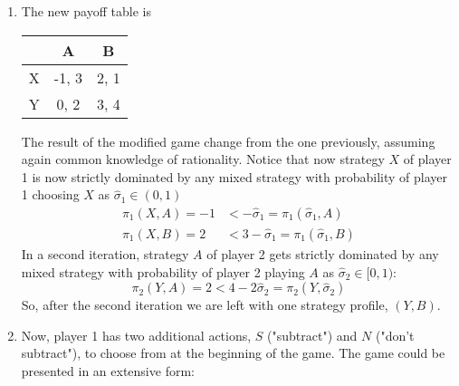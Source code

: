 \documentclass[]{article}
\begin{document}
\begin{enumerate}[label=(\roman*)]
	\item The new payoff table is
	\begin{table}[h]
		\centering
		\begin{tabular}{c|c|c}
			& A     & B    \\
			\hline
			X & -1, 3 & 2, 1 \\
			\hline
			Y & 0, 2  & 3, 4
		\end{tabular}
	\end{table}
	The result of the modified game change from the one previously, assuming again common knowledge of rationality. Notice that now strategy $X$ of player 1 is now strictly dominated by any mixed strategy with probability of player 1 choosing $X$ as $\hat{\sigma}_1\in(0, 1)$ 
	\begin{equation}
		\begin{split}
		\pi_1(X, A) = -1 &< -\hat{\sigma}_1 = \pi_1(\hat{\sigma}_1, A)\\ \nonumber
		\pi_1(X, B) = 2 &< 3 - \hat{\sigma}_1 = \pi_1(\hat{\sigma}_1, B)
		\end{split}
	\end{equation}
	In a second iteration, strategy $A$ of player 2 gets strictly dominated by any mixed strategy with probability of player 2 playing $A$ as $\hat{\sigma}_2\in [0, 1)$:
	\begin{equation}
		\pi_2(Y, A) = 2 < 4 - 2\hat{\sigma}_2 = \pi_2(Y, \hat{\sigma}_2)\nonumber
	\end{equation}
	So, after the second iteration we are left with one strategy profile, $(Y, B)$.
	
	\item Now, player 1 has two additional actions, $S$ ("subtract") and $N$ ("don't subtract"), to choose from at the beginning of the game. The game could be presented in an extensive form:
	\begin{figure}[h]
		\begin{center}
\end{center}
\end{figure}
\end{enumerate}
\end{document}
